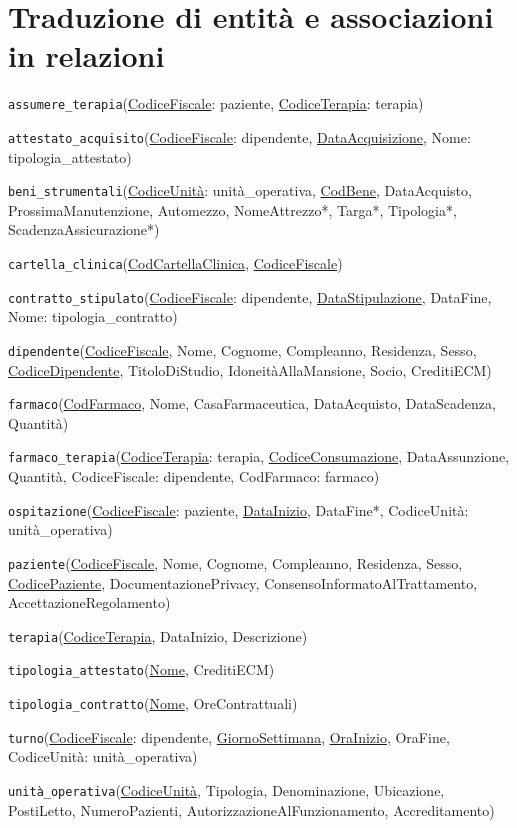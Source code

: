 \documentclass[a4paper, 12pt]{report}
\newenvironment{packed_itemize}{
\begin{itemize}
        \setlength{\itemsep}{1pt}
        \setlength{\parskip}{0pt}
        \setlength{\parsep}{0pt}
}{\end{itemize}}
\begin{document}
\section{Traduzione di entità e associazioni in relazioni}
\begin{packed_itemize}
        \item \texttt{assumere\_terapia}(\uline{CodiceFiscale}: paziente, \uline{CodiceTerapia}: terapia)
        \item \texttt{attestato\_acquisito}(\uline{CodiceFiscale}: dipendente, \uline{DataAcquisizione}, Nome: tipologia\_attestato)
        \item \texttt{beni\_strumentali}(\uline{CodiceUnità}: unità\_operativa, \uline{CodBene}, DataAcquisto, ProssimaManutenzione, 
                        Automezzo, NomeAttrezzo*, Targa*, Tipologia*, ScadenzaAssicurazione*)
        \item \texttt{cartella\_clinica}(\uline{CodCartellaClinica}, \uline{CodiceFiscale})
        \item \texttt{contratto\_stipulato}(\uline{CodiceFiscale}: dipendente, \uline{DataStipulazione}, DataFine, Nome: tipologia\_contratto)
        \item \texttt{dipendente}(\uline{CodiceFiscale}, Nome, Cognome, Compleanno, Residenza, Sesso, \\\uline{CodiceDipendente}, TitoloDiStudio,
                        IdoneitàAllaMansione, Socio, CreditiECM)
        \item \texttt{farmaco}(\uline{CodFarmaco}, Nome, CasaFarmaceutica, DataAcquisto, DataScadenza, Quantità)
        \item \texttt{farmaco\_terapia}(\uline{CodiceTerapia}: terapia, \uline{CodiceConsumazione}, DataAssunzione, \\Quantità,
                        CodiceFiscale: dipendente, CodFarmaco: farmaco)
        \item \texttt{ospitazione}(\uline{CodiceFiscale}: paziente, \uline{DataInizio}, DataFine*, CodiceUnità: unità\_operativa)
        \item \texttt{paziente}(\uline{CodiceFiscale}, Nome, Cognome, Compleanno, Residenza, Sesso, \\\uline{CodicePaziente}, 
                        DocumentazionePrivacy, ConsensoInformatoAlTrattamento, AccettazioneRegolamento)
        \item \texttt{terapia}(\uline{CodiceTerapia}, DataInizio, Descrizione)
        \item \texttt{tipologia\_attestato}(\uline{Nome}, CreditiECM)
        \item \texttt{tipologia\_contratto}(\uline{Nome}, OreContrattuali)
        \item \texttt{turno}(\uline{CodiceFiscale}: dipendente, \uline{GiornoSettimana}, \uline{OraInizio}, OraFine, CodiceUnità: unità\_operativa)
        \item \texttt{unità\_operativa}(\uline{CodiceUnità}, Tipologia, Denominazione, Ubicazione, PostiLetto, NumeroPazienti, 
                        AutorizzazioneAlFunzionamento, Accreditamento)
\end{packed_itemize}
\end{document}
